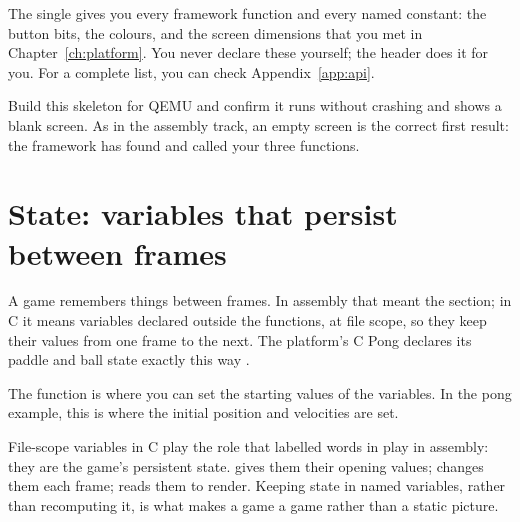 

The single  gives you every framework function and every
named constant: the button bits, the colours, and the screen dimensions that you
met in Chapter~\ref{ch:platform}. You never declare these yourself; the header does
it for you. For a complete list, you can check Appendix~\ref{app:api}.

\begin{prgcheck}
Build this skeleton for QEMU and confirm it runs without crashing and shows a
blank screen. As in the assembly track, an empty screen is the correct first
result: the framework has found and called your three functions.
\end{prgcheck}

\section{State: variables that persist between frames}

A game remembers things between frames. In assembly that meant the 
section; in C it means variables declared outside the functions, at file scope,
so they keep their values from one frame to the next. The platform's C Pong
declares its paddle and ball state exactly this way \citep{prg32repo}.



The  function is where you can set the starting values of the variables.
In the pong example, this is where the initial position and velocities are set.



\begin{prgconcept}
File-scope variables in C play the role that labelled words in  play
in assembly: they are the game's persistent state.  gives them their
opening values;  changes them each frame;  reads them to
render. Keeping state in named variables, rather than recomputing it, is what
makes a game a game rather than a static picture.
\end{prgconcept}

